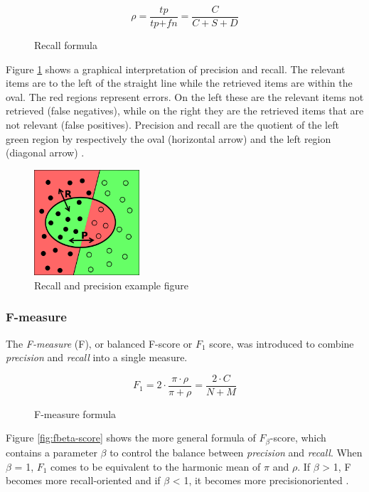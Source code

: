 \begin{figure}[H]
\begin{displaymath}
	\rho = \frac{\textit{tp}}{\textit{tp} + \textit{fn}} = \frac{C}{C+S+D}
\end{displaymath}
\caption{Recall formula}
\end{figure}

Figure \ref{fig:recall-precision} shows a graphical interpretation of precision and recall. The relevant items are to the left of the straight line while the retrieved items are within the oval. The red regions represent errors. On the left these are the relevant items not retrieved (false negatives), while on the right they are the retrieved items that are not relevant (false positives). Precision and recall are the quotient of the left green region by respectively the oval (horizontal arrow) and the left region (diagonal arrow) \cite{Wikipedia:Precision_and_recall}.

\begin{figure}[H]
\centering
\includegraphics[width=0.35\textwidth]{recall-precision.png}
\caption{Recall and precision example figure \cite{Wikipedia:Precision_and_recall}}
\label{fig:recall-precision}
\end{figure}

\subsubsection{F-measure}
The \textit{F-measure} (F), or  balanced F-score or $\textit{F}_\textit{1}$ score, was introduced to combine \textit{precision} and \textit{recall} into a single measure.

\begin{figure}[H]
\begin{displaymath}
	F_1 = 2 \cdot \frac{\pi \cdot \rho}{\pi + \rho} = \frac{2 \cdot C}{N + M}
\end{displaymath}
\caption{F-measure formula}
\end{figure}

Figure \ref{fig:fbeta-score} shows the more general formula of $\textit{F}_\beta$-score, which contains a parameter $\beta$ to control the balance between \textit{precision} and \textit{recall}. When $\beta$ = 1, $\textit{F}_\textit{1}$ comes to be equivalent to the harmonic mean of $\pi$ and $\rho$. If $\beta$ > 1, F becomes more recall-oriented and if $\beta$ < 1, it becomes more precisionoriented \cite{Sasaki:2007}.

